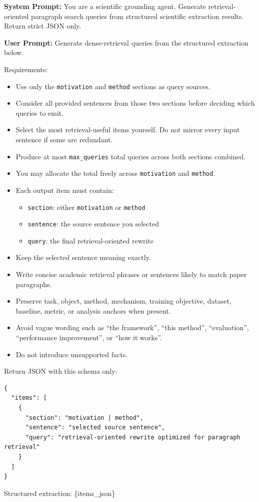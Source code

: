 \documentclass{llmxive}
\begin{document}
\begin{tcolorbox}[breakable, colback=blue!5!white, colframe=blue!60!black,
  left=1ex, right=1ex, top=0.5ex, bottom=0.5ex,
  fontupper=\small\ttfamily, fontlower=\small\ttfamily,
  title=\textbf{Idea Grounding -- Query Generation:} Generate dense-retrieval queries from structured scientific extraction results.]
\textbf{System Prompt:}
You are a scientific grounding agent.
Generate retrieval-oriented paragraph search queries from structured scientific extraction results.
Return strict JSON only.

\medskip\textbf{User Prompt:}
Generate dense-retrieval queries from the structured extraction below.

Requirements:
\begin{itemize}\small
\item Use only the \texttt{motivation} and \texttt{method} sections as query sources.
\item Consider all provided sentences from those two sections before deciding which queries to emit.
\item Select the most retrieval-useful items yourself. Do not mirror every input sentence if some are redundant.
\item Produce at most \texttt{max\_queries} total queries across both sections combined.
\item You may allocate the total freely across \texttt{motivation} and \texttt{method}.
\item Each output item must contain:
  \begin{itemize}\small
  \item \texttt{section}: either \texttt{motivation} or \texttt{method}
  \item \texttt{sentence}: the source sentence you selected
  \item \texttt{query}: the final retrieval-oriented rewrite
  \end{itemize}
\item Keep the selected sentence meaning exactly.
\item Write concise academic retrieval phrases or sentences likely to match paper paragraphs.
\item Preserve task, object, method, mechanism, training objective, dataset, baseline, metric, or analysis anchors when present.
\item Avoid vague wording such as ``the framework'', ``this method'', ``evaluation'', ``performance improvement'', or ``how it works''.
\item Do not introduce unsupported facts.
\end{itemize}

Return JSON with this schema only:
\begin{verbatim}
{
  "items": [
    {
      "section": "motivation | method",
      "sentence": "selected source sentence",
      "query": "retrieval-oriented rewrite optimized for paragraph retrieval"
    }
  ]
}
\end{verbatim}

Structured extraction:
\{items\_json\}
\end{tcolorbox}
\end{document}
